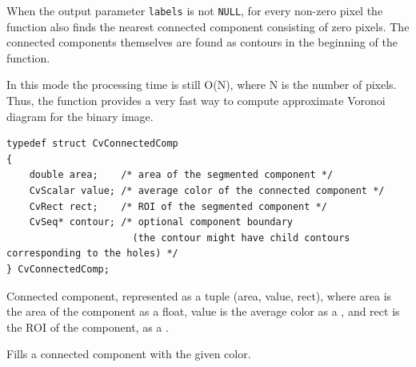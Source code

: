 When the output parameter \texttt{labels} is not \texttt{NULL}, for
every non-zero pixel the function also finds the nearest connected
component consisting of zero pixels. The connected components
themselves are found as contours in the beginning of the function.

In this mode the processing time is still O(N), where N is the number of
pixels. Thus, the function provides a very fast way to compute approximate
Voronoi diagram for the binary image.


\ifC
\begin{lstlisting}
typedef struct CvConnectedComp
{
    double area;    /* area of the segmented component */
    CvScalar value; /* average color of the connected component */
    CvRect rect;    /* ROI of the segmented component */
    CvSeq* contour; /* optional component boundary
                      (the contour might have child contours corresponding to the holes) */
} CvConnectedComp;

\end{lstlisting}
\fi

\ifPy
Connected component, represented as a tuple (area, value, rect), where
area is the area of the component as a float, value is the average color
as a , and rect is the ROI of the component, as a .
\fi

Fills a connected component with the given color.




